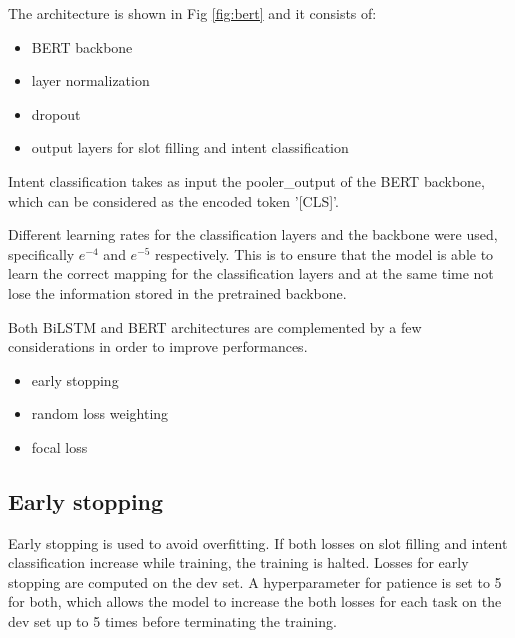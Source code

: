 \documentclass[a4paper]{article}
\begin{document}
The architecture is shown in Fig \ref{fig:bert} and it consists of:
\begin{itemize}
	\item BERT backbone
	\item layer normalization
	\item dropout
	\item output layers for slot filling and intent classification
\end{itemize}

Intent classification takes as input the pooler\_output of the BERT backbone, which can be considered as the encoded token '[CLS]'.

Different learning rates for the classification layers and the backbone were used, specifically $e^{-4}$ and $e^{-5}$ respectively. This is to ensure that the model is able to learn the correct mapping for the classification layers and at the same time not lose the information stored in the pretrained backbone. 


Both BiLSTM and BERT architectures are complemented by a few considerations in order to improve performances.

\begin{itemize}
	\item early stopping
	\item random loss weighting
	\item focal loss
\end{itemize}

\subsection{Early stopping}

Early stopping is used to avoid overfitting. If both losses on slot filling and intent classification increase while training, the training is halted. Losses for early stopping are computed on the dev set. A hyperparameter for patience is set to 5 for both, which allows the model to increase the both losses for each task on the dev set up to 5 times before terminating the training.


%	
\end{document}
